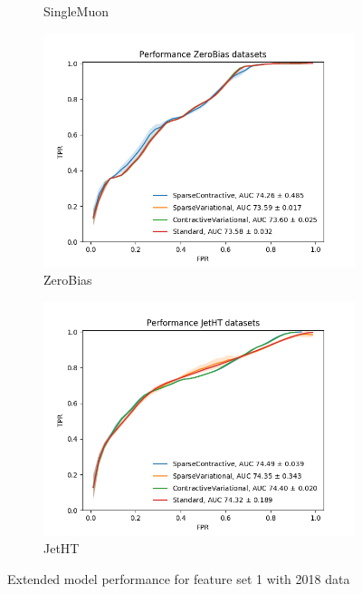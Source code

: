 \begin{figure}[h!]
\begin{subfigure}[b]{0.49\linewidth}
        \caption{SingleMuon}
    \end{subfigure}
    \begin{subfigure}[b]{0.49\linewidth}
        \includegraphics[width=\linewidth]{images/reco/2018/feature_1/performance_ZeroBias_SparseContractiveSparseVariationalContractiveVariationalStandard.png}
        \caption{ZeroBias}
    \end{subfigure}
    \begin{subfigure}[b]{0.49\linewidth}
        \includegraphics[width=\linewidth]{images/reco/2018/feature_1/performance_JetHT_SparseContractiveSparseVariationalContractiveVariationalStandard.png}
        \caption{JetHT}
    \end{subfigure}
    \caption{Extended model performance for feature set 1 with 2018 data}
\label{fig:2018_f1_exteded_ae_performance}
\end{figure}


